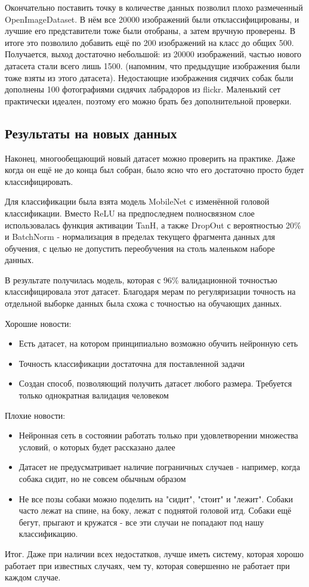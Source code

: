 Окончательно поставить точку в количестве данных позволил плохо размеченный OpenImageDataset. В нём все 20000 изображений были отклассифицированы, и лучшие его представители тоже были отобраны, а затем вручную проверены. В итоге это позволило добавить ещё по 200 изображений на класс до общих 500. Получается, выход достаточно небольшой: из 20000 изображений, частью нового датасета стали всего лишь 1500. (напомним, что предыдущие изображения были тоже взяты из этого датасета).
Недостающие изображения сидячих собак были дополнены 100 фотографиями сидячих лабрадоров из flickr. Маленький сет практически идеален, поэтому его можно брать без дополнительной проверки.

\subsection{Результаты на новых данных}\label{sect3_3_2}

Наконец, многообещающий новый датасет можно проверить на практике. Даже когда он ещё не до конца был собран, было ясно что его достаточно просто будет классифицировать.

Для классификации была взята модель MobileNet\cite{mobilenet} с изменённой головой классификации. Вместо ReLU на предпоследнем полносвязном слое использовалась функция активации TanH, а также DropOut\cite{dropout} с вероятностью 20\% и BatchNorm \cite{batchnorm} - нормализация в пределах текущего фрагмента данных для обучения, с целью не допустить переобучения на столь маленьком наборе данных.

В результате получилась модель, которая с 96\% валидационной точностью классифицировала этот датасет. Благодаря мерам по регуляризации точность на отдельной выборке данных была схожа с точностью на обучающих данных.

Хорошие новости:
\begin{itemize}
    \item Есть датасет, на котором принципиально возможно обучить нейронную сеть
    \item Точность классификации достаточна для поставленной задачи
    \item Создан способ, позволяющий получить датасет любого размера. Требуется только однократная валидация человеком
\end{itemize}


Плохие новости:
\begin{itemize}
    \item Нейронная сеть в состоянии работать только при удовлетворении множества условий, о которых будет рассказано далее
    \item Датасет не предусматривает наличие пограничных случаев - например, когда собака сидит, но не совсем обычным образом
    \item Не все позы собаки можно поделить на "сидит", "стоит" и "лежит". Собаки часто лежат на спине, на боку, лежат с поднятой головой итд. Собаки ещё бегут, прыгают и кружатся - все эти случаи не попадают под нашу классификацию.
\end{itemize}

Итог. Даже при наличии всех недостатков, лучше иметь систему, которая хорошо работает при известных случаях, чем ту, которая совершенно не работает при каждом случае. \cite{karpathy}